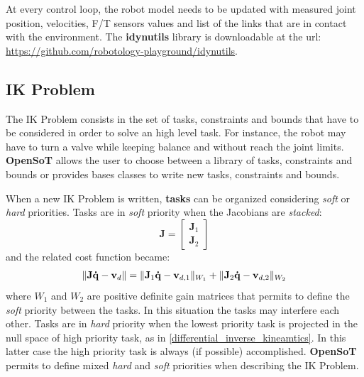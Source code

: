 At every control loop, the robot model needs to be updated with measured joint position, velocities, F/T sensors values and list of the links that are in contact with the environment. The \textbf{idynutils} library is downloadable at the url: \url{https://github.com/robotology-playground/idynutils}. 

\subsection{IK Problem}
The IK Problem consists in the set of tasks, constraints and bounds that have to be considered in order to solve an high level task. For instance, the robot may have to turn a valve while keeping balance and without reach the joint limits. \textbf{OpenSoT} allows the user to choose between a library of tasks, constraints and bounds or provides bases classes to write new tasks, constraints and bounds. 

When a new IK Problem is written, \textbf{tasks} can be organized considering \emph{soft} or \emph{hard} priorities. Tasks are in \emph{soft} priority when the Jacobians are \emph{stacked}:
\begin{equation}
\mathbf{J} = \begin{bmatrix}
\mathbf{J}_1\\ 
\mathbf{J}_2
\end{bmatrix}
\end{equation}
and the related cost function became:
\begin{equation}
\Arrowvert \mathbf{J} \mathbf{\dot{q}}-\mathbf{v}_d \Arrowvert = \Arrowvert \mathbf{J}_1 \mathbf{\dot{q}}-\mathbf{v}_{d,1} \Arrowvert_{W_1} + \Arrowvert \mathbf{J}_2 \mathbf{\dot{q}}-\mathbf{v}_{d,2} \Arrowvert_{W_2}
\end{equation}
where $W_1$ and $W_2$ are positive definite gain matrices that permits to define the \emph{soft} priority between the tasks. In this situation the tasks may interfere each other.
Tasks are in \emph{hard} priority when the lowest priority task is projected in the null space of high priority task, as in \ref{differential_inverse_kineamtics}. In this latter case the high priority task is always (if possible) accomplished. \textbf{OpenSoT} permits to define mixed \emph{hard} and \emph{soft} priorities when describing the IK Problem. 

